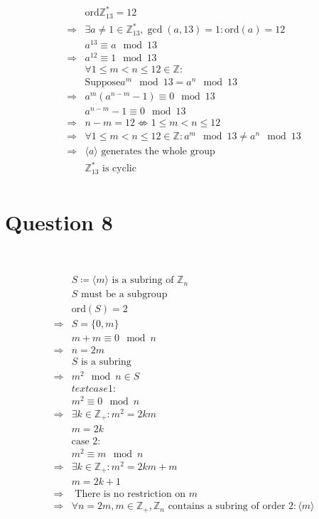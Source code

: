 \documentclass{article}
\begin{document}
~

\begin{align*}
    &\text{ord}\mathbb{Z}^*_{13}=12\\
    \Rightarrow&\exists a\ne1\in\mathbb{Z}^*_{13},\gcd(a,13)=1:\text{ord}(a)=12\\
    &a^{13}\equiv a\mod13\\
    \Rightarrow&a^{12}\equiv1\mod13\\
    &\forall 1\leqslant m<n\leqslant12\in\mathbb{Z} :\\
    &\text{Suppose} a^m\mod13=a^n\mod13\\
    \Rightarrow&a^m(a^{n-m}-1)\equiv0\mod 13\\
    &a^{n-m}-1\equiv0\mod 13\\
    \Rightarrow&n-m=12\nLeftrightarrow1\leqslant m<n\leqslant12\\
    \Rightarrow&\forall 1\leqslant m<n\leqslant12\in\mathbb{Z} :a^m\mod13\ne a^n\mod13\\
    \Rightarrow&\langle a\rangle\text{ generates the whole group}\\
    &\mathbb{Z}^*_{13}\text{ is cyclic}\\
\end{align*}

\newpage

\section*{Question 8}

~

\begin{align*}
    &S\coloneqq \langle m\rangle\text{ is a subring of }\mathbb{Z} _n\\
    &S\text{ must be a subgroup}\\
    &\text{ord}(S)=2\\
    \Rightarrow&S=\{0,m\}\\
    &m+m\equiv 0\mod n\\
    \Rightarrow&n=2m\\
    &S\text{ is a subring}\\
    \Rightarrow&m^2\mod n\in S\\
    &text{case 1}:\\
    &m^2\equiv 0\mod n\\
    \Rightarrow&\exists k\in\mathbb{Z} _+:m^2=2km\\
    &m=2k\\
    &\text{case 2}:\\
    &m^2\equiv m\mod n\\
    \Rightarrow&\exists k\in\mathbb{Z} _+:m^2=2km+m\\
    &m=2k+1\\
    \Rightarrow&\text{ There is no restriction on }m\\
    \Rightarrow&\forall n=2m,m\in\mathbb{Z} _+,\mathbb{Z} _n\text{ contains a subring of order }2:\langle m\rangle\\
\end{align*}
\end{document}
